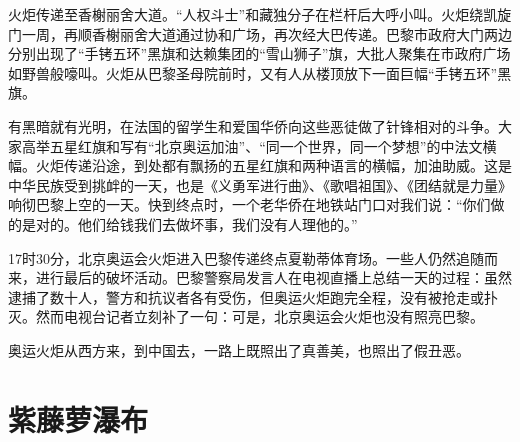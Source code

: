 \documentclass[12pt,UTF-8,openany]{ctexbook}
\begin{document}
\begin{large}
    火炬传递至香榭丽舍大道。“人权斗士”和藏独分子在栏杆后大呼小叫。火炬绕凯旋门一周，再顺香榭丽舍大道通过协和广场，再次经大巴传递。巴黎市政府大门两边分别出现了“手铐五环”黑旗和达赖集团的“雪山狮子”旗，大批人聚集在市政府广场如野兽般嚎叫。火炬从巴黎圣母院前时，又有人从楼顶放下一面巨幅“手铐五环”黑旗。
    
    有黑暗就有光明，在法国的留学生和爱国华侨向这些恶徒做了针锋相对的斗争。大家高举五星红旗和写有“北京奥运加油”、“同一个世界，同一个梦想”的中法文横幅。火炬传递沿途，到处都有飘扬的五星红旗和两种语言的横幅，加油助威。这是中华民族受到挑衅的一天，也是《义勇军进行曲》、《歌唱祖国》、《团结就是力量》响彻巴黎上空的一天。快到终点时，一个老华侨在地铁站门口对我们说：“你们做的是对的。他们给钱我们去做坏事，我们没有人理他的。”
    
    17时30分，北京奥运会火炬进入巴黎传递终点夏勒蒂体育场。一些人仍然追随而来，进行最后的破坏活动。巴黎警察局发言人在电视直播上总结一天的过程：虽然逮捕了数十人，警方和抗议者各有受伤，但奥运火炬跑完全程，没有被抢走或扑灭。然而电视台记者立刻补了一句：可是，北京奥运会火炬也没有照亮巴黎。
    
    奥运火炬从西方来，到中国去，一路上既照出了真善美，也照出了假丑恶。
    
\end{large}



\chapter{紫藤萝瀑布}
\end{document}
